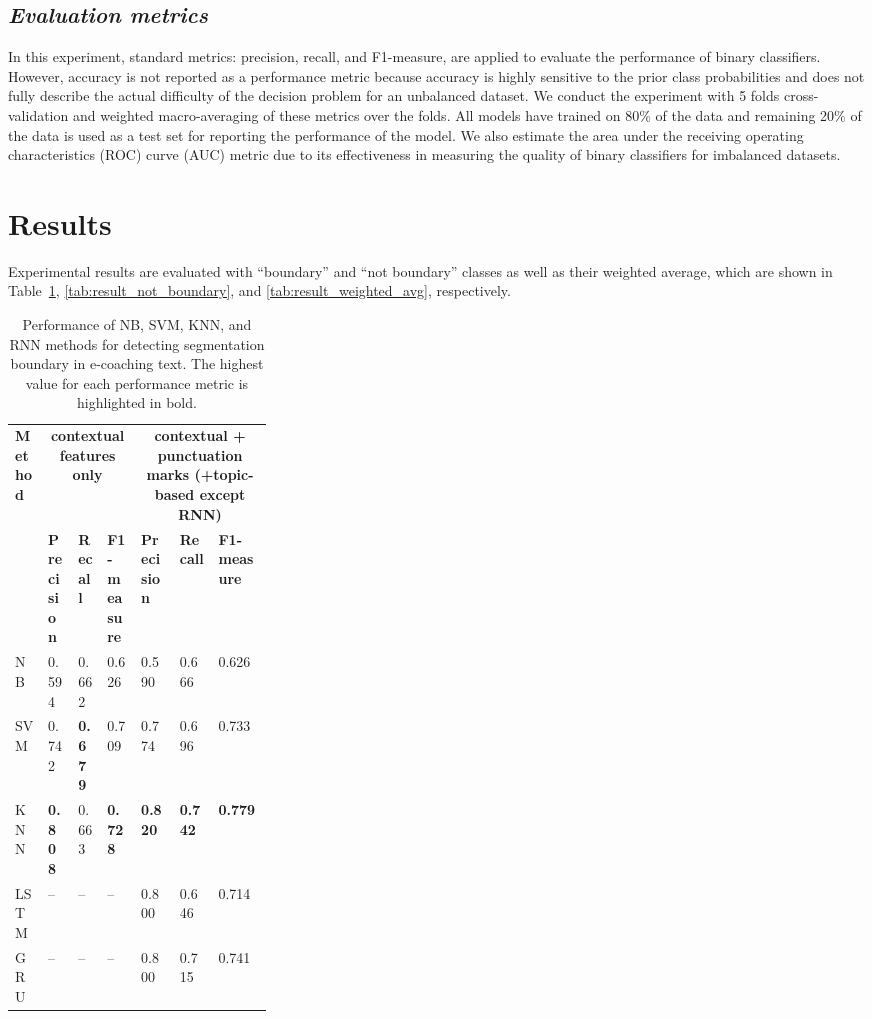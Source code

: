 \documentclass{amia}
\begin{document}
\subsection*{\textit{Evaluation metrics}}
In this experiment, standard metrics: precision, recall, and F1-measure, are applied to evaluate the performance of binary classifiers\cite{aas1999text}. However, accuracy is not reported as a performance metric because accuracy is highly sensitive to the prior class probabilities and does not fully describe the actual difficulty of the decision problem for an unbalanced dataset. We conduct the experiment with 5 folds cross-validation and weighted macro-averaging of these metrics over the folds. All models have trained on 80\% of the data and remaining 20\% of the data is used as a test set for reporting the performance of the model. We also estimate the area under the receiving operating characteristics (ROC) curve\cite{kumar2011receiver} (AUC) metric due to its effectiveness in measuring the quality of binary classifiers for imbalanced datasets\cite{hu2015kernelized}. 

\section*{Results}
Experimental results are evaluated with ``boundary'' and ``not boundary'' classes as well as their weighted average, which are shown in Table~\ref{tab:result_boundary}, \ref{tab:result_not_boundary}, and \ref{tab:result_weighted_avg}, respectively.\\

\begin{table}[ht]
\centering
\caption{Performance of NB, SVM, KNN, and RNN methods for detecting segmentation boundary in e-coaching text. The highest value for each performance metric is highlighted in bold.}
\label{tab:result_boundary}
  \begin{tabular}{|l|l|l|l|p{0.15\linewidth}|p{0.15\linewidth}|l|}
  \hline
   \multirow{2}{*}{\textbf{Method}} & \multicolumn{3}{|c|}{\textbf{contextual features only}} & \multicolumn{3}{|c|}{\textbf{contextual + punctuation marks (+topic-based except RNN)}} \\\cline{2-7}
   & \textbf{Precision}  & \textbf{Recall} & \textbf{F1-measure} & \textbf{Precision}  & \textbf{Recall} & \textbf{F1-measure}\\ \hline    
    
 NB & 0.594 & 0.662 & 0.626 & 0.590 & 0.666 & 0.626 \\ \hline
 SVM & 0.742 & \textbf{0.679} & 0.709 & 0.774 & 0.696 & 0.733\\ \hline
 KNN & \textbf{0.808} & 0.663 & \textbf{0.728} & \textbf{0.820} & \textbf{0.742} & \textbf{0.779}\\ \hline
 LSTM & -- & -- & -- & 0.800 & 0.646 & 0.714  \\ \hline
 GRU & -- & -- & -- & 0.800 & 0.715 & 0.741 \\ \hline 
  \end{tabular}
\end{table}                 
\end{document}
